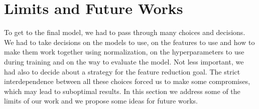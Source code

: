 \section{Limits and Future Works}

To get to the final model, we had to pass through many choices and decisions. We had to take decisions on the models to use, on the features to use and how to 
make them work together using normalization, on the hyperparameters to use during training and on the way to evaluate the model. Not less important, we had also
to decide about a strategy for the feature reduction goal. The strict interdependence between all these choices forced us to make some compromises, which may lead
to suboptimal results. 
In this section we address some of the limits of our work and we propose some ideas for future works.

